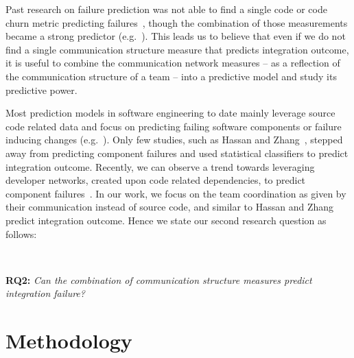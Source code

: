 Past research on failure prediction was not able to find a single code or code
churn metric predicting
failures~\cite{nagappan:icse:2006,basili:1996tse,denaro:2002seke}, though the
combination of those measurements became a strong predictor
(e.g.~\cite{mockus:2000bell}). This leads us to believe that even if we do not
find a single communication structure measure that predicts integration outcome,
it is useful to combine the communication network measures -- as a reflection of
the communication structure of a team -- into a predictive model and study its
predictive power.

Most prediction models in software engineering to date mainly leverage source
code related data and focus on predicting failing software components or failure
inducing changes
(e.g.~\cite{bell:2005tse,schroeter:isese:2006,zimmermann:icse:2008,kim:2008tse}).
Only few studies, such as Hassan and Zhang~\cite{hassan:ase:2006}, stepped away
from predicting component failures and used statistical classifiers to predict
integration outcome. Recently, we can observe a trend towards leveraging
developer networks, created upon code related dependencies, to predict component
failures~\cite{pinzger:fse:2008,meneely:fse:2008}. In our work, we focus on the
team coordination as given by their communication instead of source code, and
similar to Hassan and Zhang predict integration outcome. Hence we state our
second research question as follows:

\ \

\noindent\textbf{RQ2:} \emph{Can the combination of communication structure
measures predict integration failure?}








\section{Methodology}
\label{sec:Methodology}

